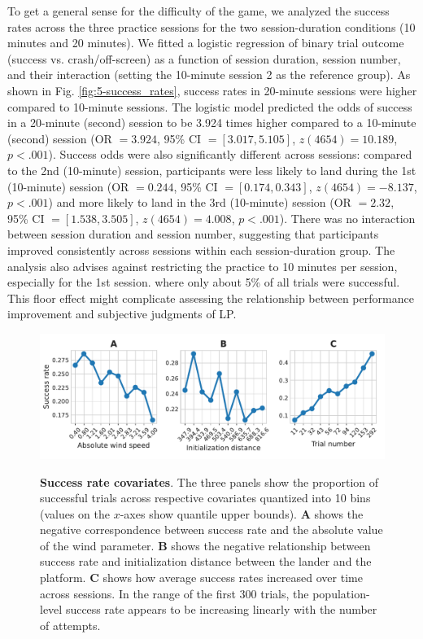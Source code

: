 To get a general sense for the difficulty of the game, we analyzed the success rates across the three practice sessions for the two session-duration conditions (10 minutes and 20 minutes). We fitted a logistic regression of binary trial outcome (success vs. crash/off-screen) as a function of session duration, session number, and their interaction (setting the 10-minute session 2 as the reference group). As shown in Fig. \ref{fig:5-success_rates}, success rates in 20-minute sessions were higher compared to 10-minute sessions. The logistic model predicted the odds of success in a 20-minute (second) session to be 3.924 times higher compared to a 10-minute (second) session (\ac{OR} $=3.924$, 95\% CI $=[3.017, 5.105]$, $z(4654)=10.189$, $p<.001$). Success odds were also significantly different across sessions: compared to the 2nd (10-minute) session, participants were less likely to land during the 1st (10-minute) session (\ac{OR} $=0.244$, 95\% CI $=[0.174, 0.343]$, $z(4654)=-8.137$, $p<.001$) and more likely to land in the 3rd (10-minute) session (\ac{OR} $=2.32$, 95\% CI $=[1.538, 3.505]$, $z(4654)=4.008$, $p<.001$). There was no interaction between session duration and session number, suggesting that participants improved consistently across sessions within each session-duration group. The analysis also advises against restricting the practice to 10 minutes per session, especially for the 1st session. where only about 5\% of all trials were successful. This floor effect might complicate assessing the relationship between performance improvement and subjective judgments of \ac{LP}.  

\begin{figure}[t]
    \centering
    {\includegraphics[width=\linewidth]{Figures/c5/init_param_effects.pdf}}
    \caption[short figure description]{\textbf{Success rate covariates}. The three panels show the proportion of successful trials across respective covariates quantized into 10 bins (values on the $x$-axes show quantile upper bounds). \textbf{A} shows the negative correspondence between success rate and the absolute value of the wind parameter. \textbf{B} shows the negative relationship between success rate and initialization distance between the lander and the platform. \textbf{C} shows how average success rates increased over time across sessions. In the range of the first 300 trials, the population-level success rate appears to be increasing linearly with the number of attempts.}\label{fig:5-init_param_effects}
\end{figure}

